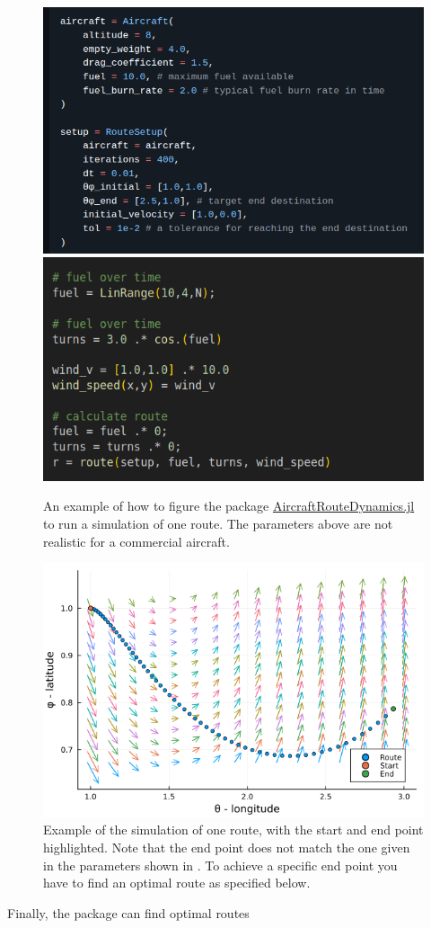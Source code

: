 \documentclass{article}
\begin{document}
\begin{figure}[h]
    \centering
    \includegraphics[width = 0.53\linewidth]{configure-aircraft.png}
    \includegraphics[width = 0.46\linewidth]{run-aircraft.png}
    \caption{An example of how to figure the package \href{https://github.com/arturgower/AircraftRouteDynamics.jl/tree/main}{AircraftRouteDynamics.jl} to run a simulation of one route. The parameters above are not realistic for a commercial aircraft.}
    \label{fig:configure-aircraft}
\end{figure}

\begin{figure}[h]
    \centering
    \includegraphics[width = 0.6\linewidth]{readme-1.png}
    \caption{Example of the simulation of one route, with the start and end point highlighted. Note that the end point does not match the one given in the parameters shown in . To achieve a specific end point you have to find an optimal route as specified below.}
    \label{fig:one-route}
\end{figure}

Finally, the package can find optimal routes
\end{document}
